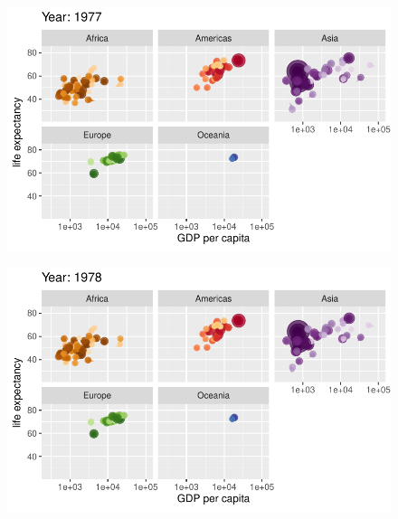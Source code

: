 \documentclass[
  letterpaper,
  DIV=11,
  numbers=noendperiod]{scrartcl}
\begin{document}
\begin{figure}[H]

{\centering \includegraphics{class05_files/figure-pdf/unnamed-chunk-24-46.pdf}

}

\end{figure}

\begin{figure}[H]

{\centering \includegraphics{class05_files/figure-pdf/unnamed-chunk-24-47.pdf}

}

\end{figure}
\end{document}
